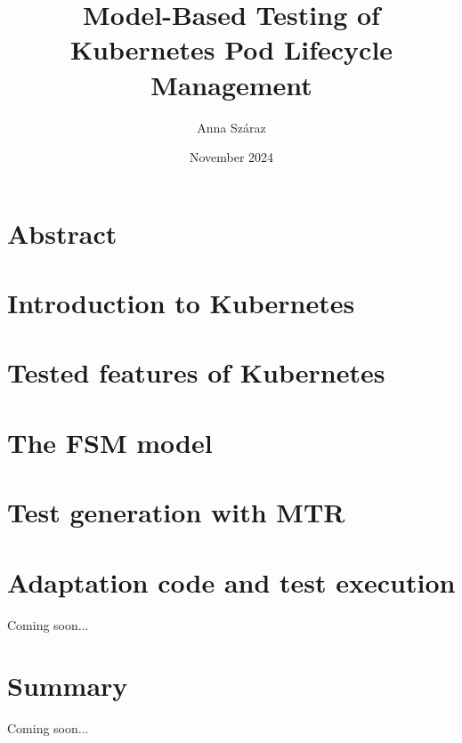 \documentclass{article}
\title{Model-Based Testing of Kubernetes Pod Lifecycle Management
}
\author{Anna Száraz}
\date{November 2024}
\begin{document}
\maketitle

\section*{Abstract}


\pagebreak
\tableofcontents
\pagebreak

\section{Introduction to Kubernetes}


\pagebreak

\section{Tested features of Kubernetes}


\pagebreak

\section{The FSM model}


\pagebreak

\section{Test generation with MTR}


\pagebreak

\section{Adaptation code and test execution}
Coming soon...
%

\section{Summary}
%
Coming soon...

\printbibliography
\end{document}
